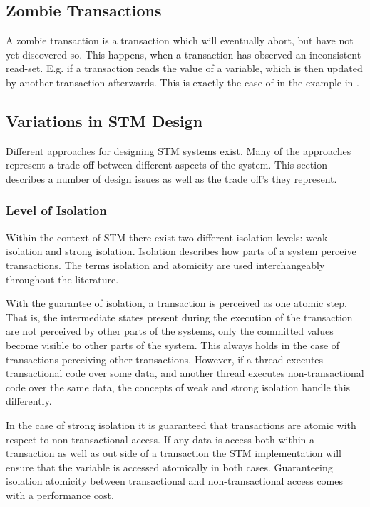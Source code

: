 \subsection{Zombie Transactions}
\label{subsec:zombie}
A zombie transaction is a transaction which will eventually abort, but have not yet discovered so. This happens, when a transaction has observed an inconsistent read-set\cite[p. 196]{dice2006transactional}. E.g. if a transaction reads the value of a variable, which is then updated by another transaction afterwards. This is exactly the case of  in the example in . 

\subsection{Variations in \ac{STM} Design}
Different approaches for designing \ac{STM} systems exist. Many of the approaches represent a trade off between different aspects of the system. This section describes a number of design issues as well as the trade off's they represent.

\subsubsection{Level of Isolation}
\label{subsec:isolation_level}
Within the context of \ac{STM} there exist two different isolation levels: weak isolation and strong isolation. Isolation describes how parts of a system perceive transactions. The terms isolation and atomicity are used interchangeably throughout the literature\cite[p. 30]{harris2010transactional}.

With the guarantee of isolation, a transaction is perceived as one atomic step. That is, the intermediate states present during the execution of the transaction are not perceived by other parts of the systems, only the committed values become visible to other parts of the system. This always holds in the case of transactions perceiving other transactions. However, if a thread executes transactional code over some data, and another thread executes non-transactional code over the same data, the concepts of weak and strong isolation handle this differently.

In the case of strong isolation it is guaranteed that transactions are atomic with respect to non-transactional access\cite[p. 2083]{herlihy2011tm}. If any data is access both within a transaction as well as out side of a transaction the \ac{STM} implementation will ensure that the variable is accessed atomically in both cases. Guaranteeing isolation atomicity between transactional and non-transactional access comes with a  performance cost\cite{herlihy2011tm}. 

